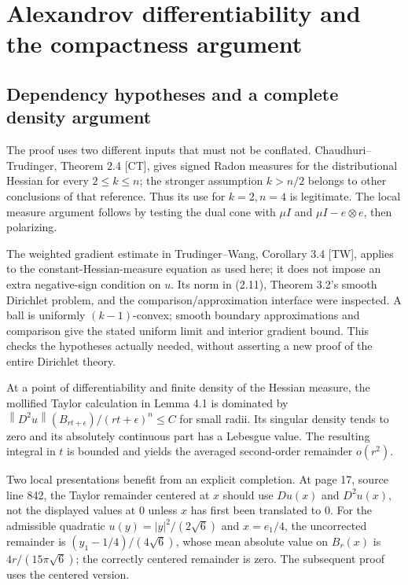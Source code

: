 \documentclass[10pt]{article}
\begin{document}
\section*{Alexandrov differentiability and the compactness argument}
\subsection*{Dependency hypotheses and a complete density argument}
The proof uses two different inputs that must not be conflated. Chaudhuri–Trudinger, Theorem 2.4 [CT], gives signed Radon measures for the distributional Hessian for every \(2\le k\le n\); the stronger assumption \(k>n/2\) belongs to other conclusions of that reference. Thus its use for \(k=2,n=4\) is legitimate. The local measure argument follows by testing the dual cone with \(\mu I\) and \(\mu I-e\otimes e\), then polarizing.\par
The weighted gradient estimate in Trudinger–Wang, Corollary 3.4 [TW], applies to the constant-Hessian-measure equation as used here; it does not impose an extra negative-sign condition on \(u\). Its norm in (2.11), Theorem 3.2’s smooth Dirichlet problem, and the comparison/approximation interface were inspected. A ball is uniformly \((k-1)\)-convex; smooth boundary approximations and comparison give the stated uniform limit and interior gradient bound. This checks the hypotheses actually needed, without asserting a new proof of the entire Dirichlet theory.\par
At a point of differentiability and finite density of the Hessian measure, the mollified Taylor calculation in Lemma 4.1 is dominated by \(\left\lVert D^2u\right\rVert(B_{rt+\epsilon})/(rt+\epsilon)^n\le C\) for small radii. Its singular density tends to zero and its absolutely continuous part has a Lebesgue value. The resulting integral in \(t\) is bounded and yields the averaged second-order remainder \(o(r^2)\).\par
Two local presentations benefit from an explicit completion. At page 17, source line 842, the Taylor remainder centered at \(x\) should use \(Du(x)\) and \(D^2u(x)\), not the displayed values at 0 unless \(x\) has first been translated to 0. For the admissible quadratic \(u(y)=|y|^2/(2\sqrt6)\) and \(x=e_1/4\), the uncorrected remainder is \((y_1-1/4)/(4\sqrt6)\), whose mean absolute value on \(B_r(x)\) is \(4r/(15\pi\sqrt6)\); the correctly centered remainder is zero. The subsequent proof uses the centered version.\par
\end{document}
